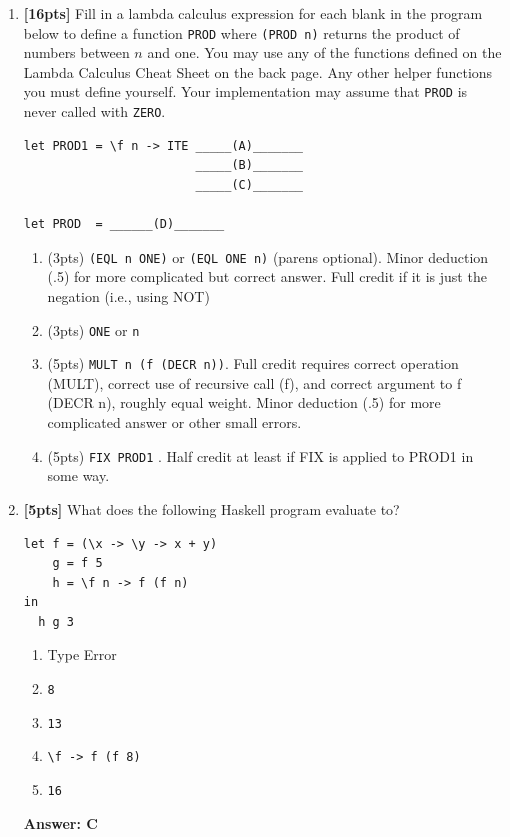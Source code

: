 \documentclass[paper=letter, fontsize=13pt]{article} %
\numberwithin{equation}{section} %
\newif\ifshowanswers\showanswerstrue
\begin{document}
\begin{enumerate}
\item \textbf{[16pts]}  
Fill in a lambda calculus expression for each blank in the program
below to define a function \texttt{PROD} where \texttt{(PROD n)} returns 
the product of numbers between
$n$ and one. You may use any of the functions defined on the Lambda
Calculus Cheat Sheet on the back page.  Any other helper functions you
must define yourself. Your implementation may assume that \texttt{PROD} is never
called with \texttt{ZERO}.

\begin{verbatim}
let PROD1 = \f n -> ITE _____(A)_______
                        _____(B)_______
                        _____(C)_______
                      
let PROD  = ______(D)_______
\end{verbatim}
\begin{enumerate}[label=(\Alph*)]
   \item 
     \ifshowanswers 
      (3pts) \verb|(EQL n ONE)| or \verb|(EQL ONE n)|  (parens optional).  Minor deduction (.5) for more complicated but correct answer.  Full credit if it is just the negation (i.e., using NOT)
     \else
           \bigskip
           \bigskip
           \bigskip
           \bigskip
           \bigskip
           \bigskip
     \fi
   \item
     \ifshowanswers 
       (3pts) \verb|ONE|  or \verb|n| 
     \else
           \bigskip
           \bigskip
           \bigskip
           \bigskip
           \bigskip
           \bigskip
     \fi
   \item
     \ifshowanswers 
      (5pts) \verb|MULT n (f (DECR n))|. Full credit  requires correct operation (MULT), correct use of recursive call (f), and correct argument to f (DECR n), roughly equal weight.  Minor deduction (.5) for more complicated answer or other small errors.
     \else
           \bigskip
           \bigskip
           \bigskip
           \bigskip
           \bigskip
           \bigskip
     \fi
   \item 
     \ifshowanswers 
     (5pts) \verb|FIX PROD1| . Half credit at least if FIX is applied to PROD1 in some way.
     \else
           \bigskip
           \bigskip
           \bigskip
           \bigskip
           \bigskip
           \bigskip
     \fi
\end{enumerate}

\newpage
{}
\bigskip
\bigskip
\bigskip
\item \textbf{[5pts]} What does the following Haskell program evaluate to?
\begin{lstlisting}
let f = (\x -> \y -> x + y)
    g = f 5 
    h = \f n -> f (f n)
in 
  h g 3
\end{lstlisting}
  \begin{enumerate}
    \item Type Error
    \item \verb|8|
    \item \verb|13|
    \item \verb|\f -> f (f 8)|
    \item \verb|16|
  \end{enumerate}
\ifshowanswers
\textbf{Answer: C}
\fi
  

\end{enumerate}
\end{document}
